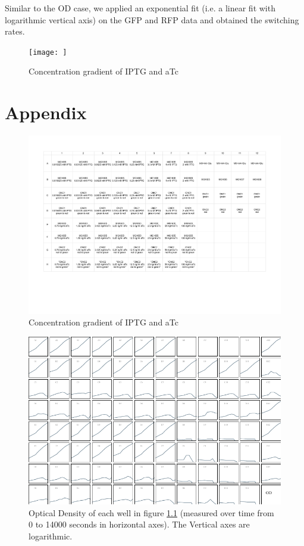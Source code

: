 \documentclass[11pt]{book}
\begin{document}
Similar to the OD case, we applied an exponential fit (i.e. a linear fit with logarithmic vertical axis) on the GFP and RFP data and obtained the switching rates. 

\begin{figure}[h]
\texttt{[image: ]}
\caption{Concentration gradient of IPTG and aTc}
\label{concGrad}
\end{figure}




\pagebreak
\chapter{Appendix}

\begin{figure}[h]
\includegraphics[scale=0.8, angle=-90, origin=c]{concentrationGradient}
\caption{Concentration gradient of IPTG and aTc}
\label{concGrad}
\end{figure}

\pagebreak

\begin{figure}[h]
\includegraphics[scale=1.7, angle=-90, origin=c]{OD-LogPlot.pdf}
\caption{
Optical Density of each well in figure \ref{concGrad} (measured over time from 0 to 14000 seconds in horizontal axes). The Vertical axes are logarithmic.}
\label{ODLogPlot}
\end{figure}
\end{document}
